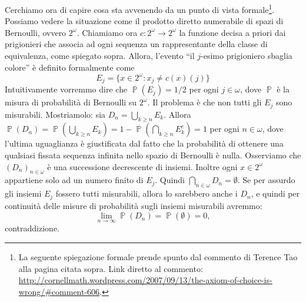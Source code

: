 \documentclass[12pt,a4paper]{report}
\theoremstyle{definition}
\theoremstyle{num.custom-title}
\DeclareMathOperator{\PPP}{\mathbb{P}}
\begin{document}
Cerchiamo ora di capire cosa sta avvenendo da un punto di vista formale\footnote{La seguente spiegazione formale prende spunto dal commento di Terence Tao alla pagina citata sopra. Link diretto al commento: \url{http://cornellmath.wordpress.com/2007/09/13/the-axiom-of-choice-is-wrong/\#comment-606}.}. Possiamo vedere la situazione come il prodotto diretto numerabile di spazi di Bernoulli, ovvero $2^\omega$. Chiamiamo ora $c: 2^\omega \to 2^\omega$ la funzione decisa a priori dai prigionieri che associa ad ogni sequenza un rappresentante della classe di equivalenza, come spiegato sopra. Allora, l'evento ``il $j$-esimo prigioniero sbaglia colore'' è definito formalmente come 
\[
E_j=\{x \in 2^\omega : x_j \neq c(x)(j)\}
\]
Intuitivamente vorremmo dire che $\PPP(E_j)=1/2$ per ogni $j \in \omega$, dove $\PPP$ è la misura di probabilità di Bernoulli su $2^\omega$. Il problema è che non tutti gli $E_j$ sono misurabili. Mostriamolo: sia $D_n=\bigcup_{k \geq n} E_k$. Allora $\PPP(D_n)=\PPP(\bigcup_{k \geq n} E_k)=1-\PPP(\bigcap_{k \geq n} E_k^c)=1$ per ogni $n \in \omega$, dove l'ultima uguaglianza è giustificata dal fatto che la probabilità di ottenere una qualsiasi fissata sequenza infinita nello spazio di Bernoulli è nulla. Osserviamo che $(D_n)_{n \in \omega}$ è una successione decrescente di insiemi. Inoltre ogni $x \in 2^\omega$ appartiene solo ad un numero finito di $E_j$. Quindi $\bigcap_{n \in \omega} D_n = \emptyset$. Se per assurdo gli insiemi $E_j$ fossero tutti misurabili, allora lo sarebbero anche i $D_n$, e quindi per continuità delle misure di probabilità sugli insiemi misurabili avremmo:
\[
\lim_{n \to \infty} \PPP(D_n) = \PPP(\emptyset)=0,
\]
contraddizione.






\cleardoublepage
\end{document}
